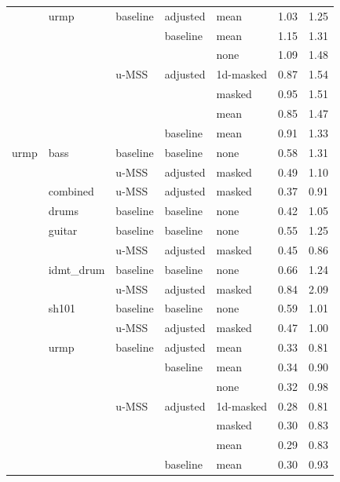 \begin{theappendices}
\begin{longtable}{lllllrr}
     & urmp & baseline & adjusted & mean &            1.03 &                  1.25 \\
     &      &       & baseline & mean &            1.15 &                  1.31 \\
     &      &       &          & none &            1.09 &                  1.48 \\
     &      & u-MSS & adjusted & 1d-masked &            0.87 &                  1.54 \\
     &      &       &          & masked &            0.95 &                  1.51 \\
     &      &       &          & mean &            0.85 &                  1.47 \\
     &      &       & baseline & mean &            0.91 &                  1.33 \\
urmp & bass & baseline & baseline & none &            0.58 &                  1.31 \\
     &      & u-MSS & adjusted & masked &            0.49 &                  1.10 \\
     & combined & u-MSS & adjusted & masked &            0.37 &                  0.91 \\
     & drums & baseline & baseline & none &            0.42 &                  1.05 \\
     & guitar & baseline & baseline & none &            0.55 &                  1.25 \\
     &      & u-MSS & adjusted & masked &            0.45 &                  0.86 \\
     & idmt\_drum & baseline & baseline & none &            0.66 &                  1.24 \\
     &      & u-MSS & adjusted & masked &            0.84 &                  2.09 \\
     & sh101 & baseline & baseline & none &            0.59 &                  1.01 \\
     &      & u-MSS & adjusted & masked &            0.47 &                  1.00 \\
     & urmp & baseline & adjusted & mean &            0.33 &                  0.81 \\
     &      &       & baseline & mean &            0.34 &                  0.90 \\
     &      &       &          & none &            0.32 &                  0.98 \\
     &      & u-MSS & adjusted & 1d-masked &            0.28 &                  0.81 \\
     &      &       &          & masked &            0.30 &                  0.83 \\
     &      &       &          & mean &            0.29 &                  0.83 \\
     &      &       & baseline & mean &            0.30 &                  0.93 \\
\bottomrule
        

\end{longtable}
\end{theappendices}
